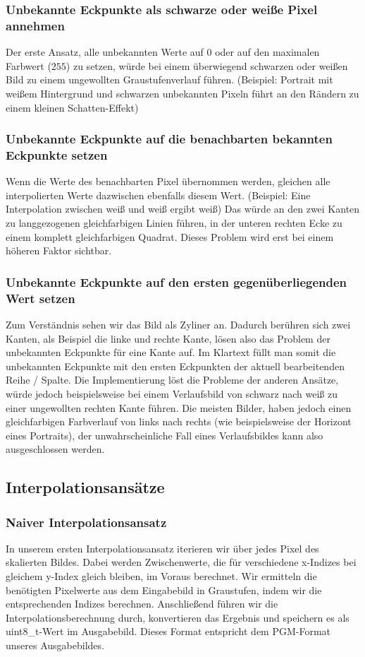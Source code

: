 \documentclass[course=erap]{aspdoc}
\begin{document}
\subsubsection{Unbekannte Eckpunkte als schwarze oder weiße Pixel annehmen}
Der erste Ansatz, alle unbekannten Werte auf $0$ oder auf den maximalen Farbwert ($255$) zu setzen, würde bei einem überwiegend schwarzen oder weißen Bild zu einem ungewollten Graustufenverlauf führen. (Beispiel: Portrait mit weißem Hintergrund und schwarzen unbekannten Pixeln führt an den Rändern zu einem kleinen Schatten-Effekt)

\subsubsection{Unbekannte Eckpunkte auf die benachbarten bekannten Eckpunkte setzen}
Wenn die Werte des benachbarten Pixel übernommen werden, gleichen alle interpolierten Werte dazwischen ebenfalls diesem Wert. (Beispiel: Eine Interpolation zwischen weiß und weiß ergibt weiß) Das würde an den zwei Kanten zu langgezogenen gleichfarbigen Linien führen, in der unteren rechten Ecke zu einem komplett gleichfarbigen Quadrat. Dieses Problem wird erst bei einem höheren Faktor sichtbar.

\subsubsection{Unbekannte Eckpunkte auf den ersten gegenüberliegenden Wert setzen}
Zum Verständnis sehen wir das Bild als Zyliner an. Dadurch berühren sich zwei Kanten, als Beispiel die linke und rechte Kante, lösen also das Problem der unbekannten Eckpunkte für eine Kante auf. Im Klartext füllt man somit die unbekannten Eckpunkte mit den ersten Eckpunkten der aktuell bearbeitenden Reihe / Spalte. Die Implementierung löst die Probleme der anderen Ansätze, würde jedoch beispielsweise bei einem Verlaufsbild von schwarz nach weiß zu einer ungewollten rechten Kante führen. Die meisten Bilder, haben jedoch einen gleichfarbigen Farbverlauf von links nach rechts (wie beispielsweise der Horizont eines Portraits), der unwahrscheinliche Fall eines Verlaufsbildes kann also ausgeschlossen werden.


\subsection{Interpolationsansätze}

\subsubsection{Naiver Interpolationsansatz}
In unserem ersten Interpolationsansatz iterieren wir über jedes Pixel des skalierten Bildes. Dabei werden Zwischenwerte, die für verschiedene x-Indizes bei gleichem y-Index gleich bleiben, im Voraus berechnet. Wir ermitteln die benötigten Pixelwerte aus dem Eingabebild in Graustufen, indem wir die entsprechenden Indizes berechnen. Anschließend führen wir die Interpolationsberechnung durch, konvertieren das Ergebnis und speichern es als uint8\_t-Wert im Ausgabebild. Dieses Format entspricht dem PGM-Format unseres Ausgabebildes.
\end{document}

